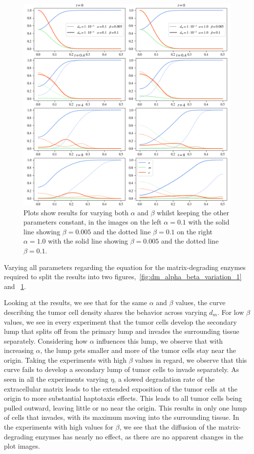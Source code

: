 \begin{figure}[h!]
    \centering
    \includegraphics[width=\textwidth]{resources/images/dm_alpha_beta_variation_2.png}
    \caption{Plots show results for varying both $\alpha$ and $\beta$ whilst keeping the other parameters constant, in the images on the left $\alpha=0.1$ with the solid line showing $\beta = 0.005$ and the dotted line $\beta=0.1$ on the right $\alpha=1.0$ with the solid line showing $\beta = 0.005$ and the dotted line $\beta=0.1$.}
    \label{fig:dm_alpha_beta_variation_2}
\end{figure}

Varying all parameters regarding the equation for the matrix-degrading enzymes required to split the results into two figures,~\ref{fig:dm_alpha_beta_variation_1} and ~\ref{fig:dm_alpha_beta_variation_2}.

Looking at the results, we see that for the same $\alpha$ and $\beta$ values, the curve describing the tumor cell density shares the behavior across varying $d_m$. For low $\beta$ values, we see in every experiment that the tumor cells develop the secondary lump that splits off from the primary lump and invades the surrounding tissue separately. Considering how $\alpha$ influences this lump, we observe that with increasing $\alpha$, the lump gets smaller and more of the tumor cells stay near the origin. Taking the experiments with high $\beta$ values in regard, we observe that this curve fails to develop a secondary lump of tumor cells to invade separately. As seen in all the experiments varying $\eta$, a slowed degradation rate of the extracellular matrix leads to the extended exposition of the tumor cells at the origin to more substantial haptotaxis effects. This leads to all tumor cells being pulled outward, leaving little or no near the origin. This results in only one lump of cells that invades, with its maximum moving into the surrounding tissue. In the experiments with high values for $\beta$, we see that the diffusion of the matrix-degrading enzymes has nearly no effect, as there are no apparent changes in the plot images.

